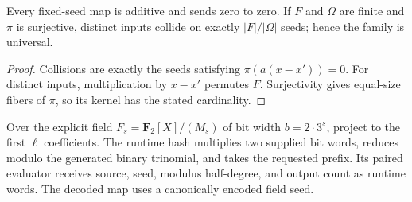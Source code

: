 \begin{theorem}
  \label{thm:lowerbounds-algebraic-field-hashing}
  \leanok
  Every fixed-seed map is additive and sends zero to zero. If $F$ and
  $\Omega$ are finite and $\pi$ is surjective, distinct inputs collide
  on exactly $|F|/|\Omega|$ seeds; hence the family is universal.
\end{theorem}
\begin{proof}
  \leanok
  Collisions are exactly the seeds satisfying $\pi(a(x-x'))=0$.
  For distinct inputs, multiplication by $x-x'$ permutes $F$.
  Surjectivity gives equal-size fibers of $\pi$, so its kernel has the
  stated cardinality.
\end{proof}

\begin{definition}
  \label{def:lowerbounds-algebraic-binary-hashing}
  \leanok
  Over the explicit field $F_s=\mathbf F_2[X]/(M_s)$ of bit width
  $b=2\cdot3^s$, project to the first $\ell$ coefficients.
  The runtime hash multiplies two supplied bit words, reduces modulo the
  generated binary trinomial, and takes the requested prefix. Its paired
  evaluator receives source, seed, modulus half-degree, and output count
  as runtime words. The decoded map uses a canonically encoded field seed.
\end{definition}


